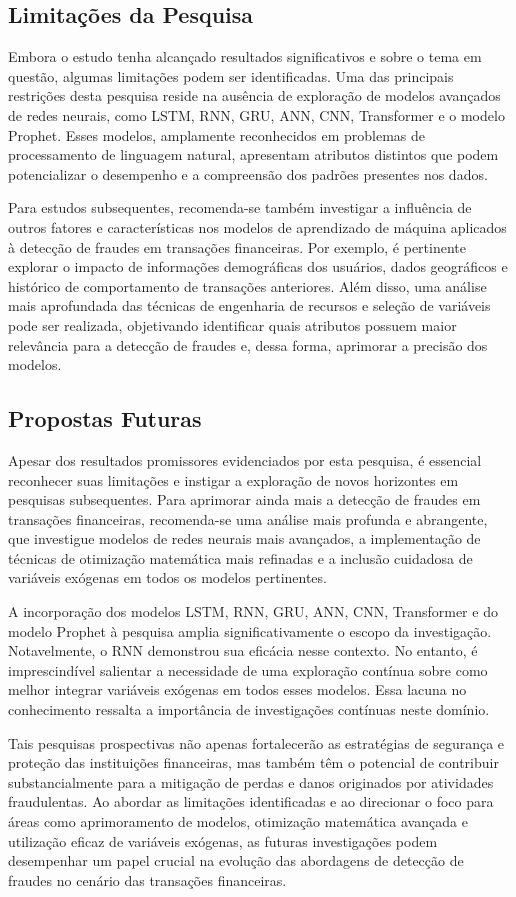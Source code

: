 \subsection{Limita\c c\~oes da Pesquisa}


Embora o estudo tenha alcançado resultados significativos e sobre o tema em questão, algumas limitações podem ser identificadas. Uma das principais restrições desta pesquisa reside na ausência de exploração de modelos avançados de redes neurais, como LSTM, RNN, GRU, ANN, CNN, Transformer e o modelo Prophet. Esses modelos, amplamente reconhecidos em problemas de processamento de linguagem natural, apresentam atributos distintos que podem potencializar o desempenho e a compreensão dos padrões presentes nos dados.

Para estudos subsequentes, recomenda-se também investigar a influência de outros fatores e características nos modelos de aprendizado de máquina aplicados à detecção de fraudes em transações financeiras. Por exemplo, é pertinente explorar o impacto de informações demográficas dos usuários, dados geográficos e histórico de comportamento de transações anteriores. Além disso, uma análise mais aprofundada das técnicas de engenharia de recursos e seleção de variáveis pode ser realizada, objetivando identificar quais atributos possuem maior relevância para a detecção de fraudes e, dessa forma, aprimorar a precisão dos modelos.

\subsection{Propostas Futuras}

Apesar dos resultados promissores evidenciados por esta pesquisa, é essencial reconhecer suas limitações e instigar a exploração de novos horizontes em pesquisas subsequentes. Para aprimorar ainda mais a detecção de fraudes em transações financeiras, recomenda-se uma análise mais profunda e abrangente, que investigue modelos de redes neurais mais avançados, a implementação de técnicas de otimização matemática mais refinadas e a inclusão cuidadosa de variáveis exógenas em todos os modelos pertinentes.

A incorporação dos modelos LSTM, RNN, GRU, ANN, CNN, Transformer e do modelo Prophet à pesquisa amplia significativamente o escopo da investigação. Notavelmente, o RNN demonstrou sua eficácia nesse contexto. No entanto, é imprescindível salientar a necessidade de uma exploração contínua sobre como melhor integrar variáveis exógenas em todos esses modelos. Essa lacuna no conhecimento ressalta a importância de investigações contínuas neste domínio.

Tais pesquisas prospectivas não apenas fortalecerão as estratégias de segurança e proteção das instituições financeiras, mas também têm o potencial de contribuir substancialmente para a mitigação de perdas e danos originados por atividades fraudulentas. Ao abordar as limitações identificadas e ao direcionar o foco para áreas como aprimoramento de modelos, otimização matemática avançada e utilização eficaz de variáveis exógenas, as futuras investigações podem desempenhar um papel crucial na evolução das abordagens de detecção de fraudes no cenário das transações financeiras.